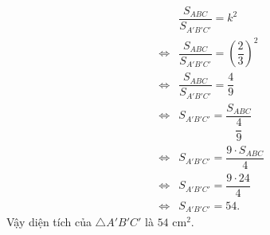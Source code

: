 \begin{ex}
{\begin{listEX}
\begin{eqnarray*}
			&&\dfrac{S_{A B C}}{S_{A'B'C'}}=k^2\\
			&\Leftrightarrow& \dfrac{S_{A B C}}{S_{A'B'C'}}=\left(\dfrac{2}{3}\right)^2\\
			&\Leftrightarrow&\dfrac{S_{A B C}}{S_{A'B'C'}}=\dfrac{4}{9}\\
			&\Leftrightarrow&S_{A'B'C'}=\dfrac{S_{A B C}}{\dfrac{4}{9}}\\
			&\Leftrightarrow&S_{A'B'C'}=\dfrac{9\cdot S_{A B C}}{4}\\
			&\Leftrightarrow&S_{A'B'C'}=\dfrac{9\cdot 24}{4}\\
			&\Leftrightarrow&S_{A'B'C'}=54.
		\end{eqnarray*}
		Vậy diện tích của $\triangle A'B'C'$ là $54$ cm$^2$.
	\end{listEX}
	}
\end{ex}

